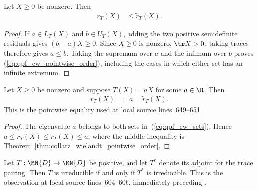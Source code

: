 \begin{theorem}
    \label{thm:collatz_wielandt_pointwise_order}
    \leanok
    Let $X\geq0$ be nonzero. Then
    \begin{align}
        r_T(X)
        &\leq\widetilde r_T(X).
        \label{eq:qpf_cw_pointwise_order}
    \end{align}
\end{theorem}

\begin{proof}\leanok
    If $a\in L_T(X)$ and $b\in U_T(X)$, adding the two positive
    semidefinite residuals gives $(b-a)X\geq0$. Since $X\geq0$ is nonzero,
    $\tr X>0$; taking traces therefore gives $a\leq b$. Taking the supremum
    over $a$ and the infimum over $b$ proves
    (\ref{eq:qpf_cw_pointwise_order}), including the cases in which either
    set has an infinite extremum.
\end{proof}

\begin{theorem}
    \label{thm:collatz_wielandt_eigenvector}
    \leanok
    Let $X\geq0$ be nonzero and suppose $T(X)=aX$ for some $a\in\R$. Then
    \begin{align}
        r_T(X)
        &=a=\widetilde r_T(X).
        \label{eq:qpf_cw_eigenvector}
    \end{align}
    This is the pointwise equality used at local source lines~649--651.
\end{theorem}

\begin{proof}\leanok
    The eigenvalue $a$ belongs to both sets in~(\ref{eq:qpf_cw_sets}). Hence
    $a\leq r_T(X)\leq\widetilde r_T(X)\leq a$, where the middle inequality is
    Theorem~\ref{thm:collatz_wielandt_pointwise_order}.
\end{proof}

\begin{theorem}
    \label{thm:trace_adjoint_irreducible_positive}
    \leanok
    Let $T:\MN{D}\to\MN{D}$ be positive, and let $T^*$ denote its adjoint
    for the trace pairing. Then $T$ is irreducible if and only if $T^*$ is
    irreducible. This is the observation at local source lines~604--606,
    immediately preceding \cite[Theorem~6.3]{Wolf2012Quantum}.
\end{theorem}

